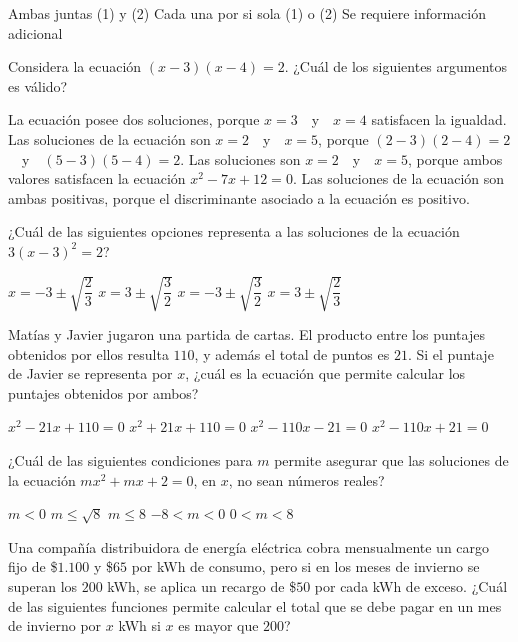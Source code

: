 \documentclass[borrador]{srs3}
\begin{document}
\begin{preguntas}
\begin{alternativas}
\alternativa Ambas juntas (1) y (2)
\alternativa Cada una por si sola (1) o (2)
\alternativa Se requiere información adicional
\end{alternativas}
\pregunta Considera la ecuación \( \left(x-3\right)\left(x-4\right)=2 \). ¿Cuál de los siguientes argumentos es válido?
\begin{alternativas}
\alternativa La ecuación posee dos soluciones, porque \(x=3\)~~y~~\(x=4\) satisfacen la igualdad.
\alternativa Las soluciones de la ecuación son \(x=2\)~~y~~\(x=5\), porque \( \left(2-3\right)\left(2-4\right)=2 \)~~y~~\( \left(5-3\right)\left(5-4\right)=2 \).
\alternativa Las soluciones son \(x=2\)~~y~~\(x=5\), porque ambos valores satisfacen la ecuación \( x^2-7x+12=0 \).
\alternativa Las soluciones de la ecuación son ambas positivas, porque el discriminante asociado a la ecuación es positivo.
\end{alternativas}
\pregunta ¿Cuál de las siguientes opciones representa a las soluciones de la ecuación \( 3\left(x-3\right)^2 = 2 \)?
\begin{alternativas}
\alternativa \( x = -3 \pm \sqrt{\dfrac{2}{3}} \)
\alternativa \( x = 3 \pm \sqrt{\dfrac{3}{2}}  \)
\alternativa \( x = -3 \pm \sqrt{\dfrac{3}{2}}  \)
\alternativa \( x = 3 \pm \sqrt{\dfrac{2}{3}}  \)
\end{alternativas}
\pregunta Matías y Javier jugaron una partida de cartas. El producto entre los puntajes obtenidos por ellos resulta \(110\), y además el total de puntos es \(21\). Si el puntaje de Javier se representa por \(x\), ¿cuál es la ecuación que permite calcular los puntajes obtenidos por ambos?
\begin{alternativas}
\alternativa \( x^2 - 21x + 110 = 0 \)
\alternativa \( x^2 + 21x + 110 = 0 \)
\alternativa \( x^2 - 110x - 21 = 0 \)
\alternativa \( x^2 - 110x + 21 = 0 \)
\end{alternativas}
\pregunta ¿Cuál de las siguientes condiciones para \(m\) permite asegurar que las soluciones de la ecuación \( mx^2+mx+2=0 \), en \(x\), no sean números reales?
\begin{alternativas}
\alternativa \( m < 0 \)
\alternativa \( m \leq \sqrt{8} \)
\alternativa \( m \leq 8 \)
\alternativa \( -8 < m < 0 \)
\alternativa \( 0 < m < 8 \)
\end{alternativas}
\pregunta Una compañía distribuidora de energía eléctrica cobra mensualmente un cargo fijo de \$$1.100$ y \$$65$ por kWh de consumo, pero si en los meses de invierno se superan los \(200\) kWh, se aplica un recargo de \$$50$ por cada kWh de exceso. ¿Cuál de las siguientes funciones permite calcular el total que se debe pagar en un mes de invierno por \(x\) kWh si \(x\) es mayor que \(200\)?

\end{preguntas}
\end{document}
